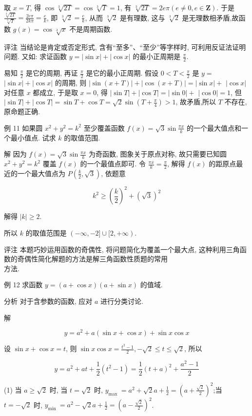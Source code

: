 	取 $x=T$, 得 $\cos \sqrt[3]{2 T}=\cos \sqrt[3]{T}=1$, 有 $\sqrt[3]{2 T}=2 e \pi(e \neq 0, e \in \mathbf{Z})$. 于是 $\frac{\sqrt[3]{2 T}}{\sqrt[3]{T}}=\frac{2 e \pi}{2 k \pi}=\frac{e}{k}$, 即 $\sqrt[3]{2}=\frac{e}{k}$, 从而 $\sqrt[3]{2}$ 是有理数, 这与 $\sqrt[3]{2}$ 是无理数相矛盾,故函数 $g(x)=\cos \sqrt[3]{x}$ 不是周期函数.

	评注 当结论是肯定或否定形式, 含有“至多”、“至少”等字样时, 可利用反证法证明问题. 又如: 求证函数 $y=|\sin x|+|\cos x|$ 的最小正周期是 $\frac{\pi}{2}$.

	易知 $\frac{\pi}{2}$ 是它的周期, 再证 $\frac{\pi}{2}$ 是它的最小正周期. 假设 $0<T<\frac{\pi}{2}$ 是 $y=$ $|\sin x|+|\cos x|$ 的周期, 则 $|\sin (x+T)|+|\cos (x+T)|=|\sin x|+$ $|\cos x|$ 对任意 $x$ 都成立, 于是取 $x=0$, 得 $|\sin T|+|\cos T|=|\sin 0|+$ $|\cos 0|=1$, 但 $|\sin T|+|\cos T|=\sin T+\cos T=\sqrt{2} \sin \left(T+\frac{\pi}{4}\right)>1$, 故矛盾,所以 $T$ 不存在,原命题正确.

	例 11 如果圆 $x^{2}+y^{2}=k^{2}$ 至少覆盖函数 $f(x)=\sqrt{3} \sin \frac{\pi x}{k}$ 的一个最大值点和一个最小值点. 试求 $k$ 的取值范围.

	解 因为 $f(x)=\sqrt{3} \sin \frac{\pi x}{k}$ 为奇函数, 图象关于原点对称, 故只需要已知圆 $x^{2}+y^{2}=k^{2}$ 覆盖 $f(x)$ 的一个最值点即可. 令 $\frac{\pi x}{k}=\frac{\pi}{2}$, 解得 $f(x)$ 的距原点最近的一个最大值点为 $P\left(\frac{k}{2}, \sqrt{3}\right)$, 依题意

	$$
		k^{2} \geqslant\left(\frac{k}{2}\right)^{2}+(\sqrt{3})^{2}
	$$

	解得 $|k| \geqslant 2$.

	所以 $k$ 的取值范围是 $(-\infty,-2] \cup[2,+\infty)$.

	评注 本题巧妙运用函数的奇偶性, 将问题简化为覆盖一个最大点, 这种利用三角函数的奇偶性简化解题的方法是解三角函数性质题的常用\\
	方法.

	例 12 求函数 $y=(a+\cos x)(a+\sin x)$ 的值域.

	分析 对于含参数的函数, 应对 $a$ 进行分类讨论.

	解

	$$
		y=a^{2}+a(\sin x+\cos x)+\sin x \cos x
	$$

	设 $\sin x+\cos x=t$, 则 $\sin x \cos x=\frac{t^{2}-1}{2},-\sqrt{2} \leqslant t \leqslant \sqrt{2}$, 所以

	$$
		y=a^{2}+a t+\frac{1}{2}\left(t^{2}-1\right)=\frac{1}{2}(t+a)^{2}+\frac{a^{2}-1}{2}
	$$

	(1) 当 $a \geqslant \sqrt{2}$ 时, 当 $t=\sqrt{2}$ 时, $y_{\text {max }}=a^{2}+\sqrt{2} a+\frac{1}{2}=\left(a+\frac{\sqrt{2}}{2}\right)^{2}$;当 $t=-\sqrt{2}$ 时, $y_{\text {min }}=a^{2}-\sqrt{2} a+\frac{1}{2}=\left(a-\frac{\sqrt{2}}{2}\right)^{2}$.

